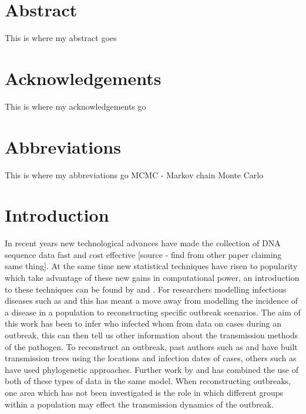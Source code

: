 \documentclass[11pt,a4paper]{report}
\begin{document}
\chapter*{Abstract}
\thispagestyle{empty}
This is where my abstract goes

\newpage

\chapter*{Acknowledgements}
\thispagestyle{empty}
This is where my acknowledgements go
\newpage

\tableofcontents
\pagestyle{plain}
\newpage

\chapter*{Abbreviations}
\thispagestyle{empty}
This is where my abbreviations go
MCMC - Markov chain Monte Carlo
\newpage


\chapter{Introduction}
In recent years new technological advances have made the collection of DNA sequence data fast and cost effective [source - find from other paper claiming same thing]. At the same time new statistical techniques have risen to popularity which take advantage of these new gains in computational power, an introduction to these techniques can be found by \citet{ONeill02} and \citet{Gibson04}. For researchers modelling infectious diseases such as \citet{Teunis13} and \citet{Wallinga04} this has meant a move away from modelling the incidence of a disease in a population to reconstructing specific outbreak scenarios. The aim of this work has been to infer who infected whom from data on cases during an outbreak, this can then tell us other information about the transmission methods of the pathogen. To reconstruct an outbreak, past authors such as \citet{Haydon03} and \citet{Jombart11} have built transmission trees using the locations and infection dates of cases, others such as \citet{Cottam08} have used phylogenetic approaches. Further work by \citet{Ypma13} and \citet{outbrkr} has combined the use of both of these types of data in the same model. When reconstructing outbreaks, one area which has not been investigated is the role in which different groups within a population may effect the transmission dynamics of the outbreak.
\end{document}
